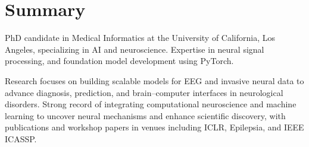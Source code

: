\section*{Summary}

PhD candidate in Medical Informatics at the University of California, Los Angeles, specializing in AI and neuroscience.  
Expertise in neural signal processing, and foundation model development using PyTorch.  

Research focuses on building scalable models for EEG and invasive neural data to advance diagnosis, prediction, and brain–computer interfaces in neurological disorders.  
Strong record of integrating computational neuroscience and machine learning to uncover neural mechanisms and enhance scientific discovery, with publications and workshop papers in venues including ICLR, Epilepsia, and IEEE ICASSP.
